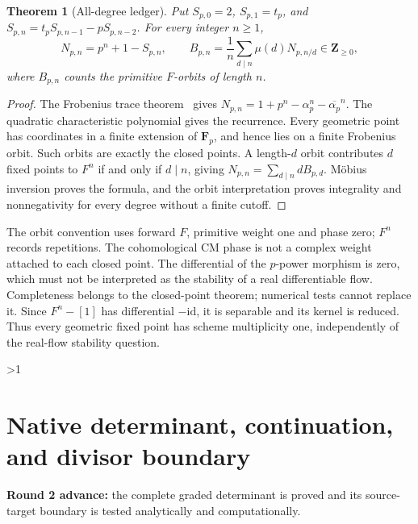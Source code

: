 \documentclass[10pt]{article}
\newtheorem{theorem}{Theorem}
\newcommand{\F}{\mathbf F}
\newcommand{\Z}{\mathbf Z}
\begin{document}
\begin{theorem}[All-degree ledger]
Put $S_{p,0}=2$, $S_{p,1}=t_p$, and
$S_{p,n}=t_pS_{p,n-1}-pS_{p,n-2}$. For every integer $n\geq1$,
\[
 N_{p,n}=p^n+1-S_{p,n},\qquad
 B_{p,n}=\frac1n\sum_{d\mid n}\mu(d)N_{p,n/d}\in\Z_{\geq0},
\]
where $B_{p,n}$ counts the primitive $F$-orbits of length $n$.
\end{theorem}
\begin{proof}
The Frobenius trace theorem~\cite[IV, Theorem 9.10 and Remark 9.11]{Milne}
gives $N_{p,n}=1+p^n-\alpha_p^n-\overline{\alpha_p}^n$.
The quadratic characteristic polynomial gives the recurrence.
Every geometric point has coordinates in a finite extension of
$\F_p$, and hence lies on a finite Frobenius orbit. Such orbits are
exactly the closed points. A length-$d$ orbit contributes $d$ fixed
points to $F^n$ if and only if $d\mid n$, giving
$N_{p,n}=\sum_{d\mid n}dB_{p,d}$. Möbius inversion proves the formula,
and the orbit interpretation proves integrality and nonnegativity for
every degree without a finite cutoff.
\end{proof}

The orbit convention uses forward $F$, primitive weight one and phase
zero; $F^n$ records repetitions. The cohomological CM phase is not a
complex weight attached to each closed point. The differential of the
$p$-power morphism is zero, which must not be interpreted as the
stability of a real differentiable flow. Completeness belongs to the
closed-point theorem; numerical tests cannot replace it.
Since $F^n-[1]$ has differential $-\mathrm{id}$, it is separable and its
kernel is reduced. Thus every geometric fixed point has scheme
multiplicity one, independently of the real-flow stability question.
\fi

\ifnum\CRevisionRound>1
\section{Native determinant, continuation, and divisor boundary}
\textbf{Round 2 advance:} the complete graded determinant is proved and
its source-target boundary is tested analytically and computationally.
\end{document}
